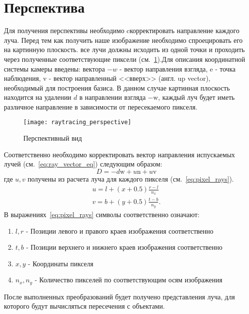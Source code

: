 \section{Перспектива}
Для получения перспективы необходимо cкорректировать направление каждого луча. Перед тем как получить наше изображение необходимо спроецировать его на картинную плоскость.
все лучи должны исходить из одной точки и проходить через полученные соответствующие пиксели (см.~\ref{fig:perspective_view}).Для описания координатной системы камеры введены:
вектора $-w$ - вектор направления взгляда, $\mathrm{e}$ - точка наблюдения, $\mathrm{v}$ - вектор направленный <<вверх>> (англ. up vector), необходимый для построения базиса.
В данном случае картинная плоскость находится на удалении $d$ в направлении взгляда $\mathrm{-w}$, каждый луч будет иметь различное направление в зависимости от пересекаемого пикселя.
\begin{figure}[H]
	\centering
	\texttt{[image: raytracing\_perspective]}
	\caption{Перспективный вид}
	\label{fig:perspective_view}
\end{figure}
Соответственно необходимо корректировать вектор направления испускаемых лучей (см.~\ref{eq:ray_vector_eq}) следующим образом:
\begin{equation}
	D = -d\mathrm{w} + u\mathrm{n} + u\mathrm{v}
\end{equation}
где $u,v$ получены из расчета луча для каждого пикселя (см.~\ref{eq:pixel_rays}).
\begin{equation}
	\begin{aligned}
		u = l + (x + 0.5)\frac{r - l}{n_x}\\
		v = b + (y + 0.5)\frac{t - b}{n_y}.
	\end{aligned}
	\label{eq:pixel_rays}
\end{equation}
В выражениях~\ref{eq:pixel_rays} символы соответственно означают:
\begin{enumerate}
	\item $l,r$ - Позиции левого  и правого краев изображения соответственно
	\item $t,b$ - Позиции верхнего и нижнего краев изображения соответственно
	\item $x,y$ - Координаты пикселя
	\item $n_x,n_y$ - Количество пикселей по соответствующим осям изображения
\end{enumerate}

После выполненных преобразований будет получено представления луча, для которого будут вычисляться
пересечения с объектами.\cite{perspective_raytracing}




